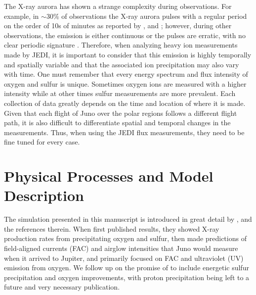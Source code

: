 \documentclass[draft]{agujournal2018}
\begin{document}
The X-ray aurora has shown a strange complexity during observations.
For example, in $\sim$30$\%$ of observations the X-ray aurora pulses with a regular period on the order of 10s of minutes as reported by \citet{dunn2016,dunn2017,gladstone2002}, and \citet{jackman2018}; however, during other observations, the emission is either continuous or the pulses are erratic, with no clear periodic signature \citep{elsner2005,branduardi2007}.
Therefore, when analyzing heavy ion measurements made by JEDI, it is important to consider that this emission is highly temporally and spatially variable and that the associated ion precipitation may also vary with time.
One must remember that every energy spectrum and flux intensity of oxygen and sulfur is unique.
Sometimes oxygen ions are measured with a higher intensity while at other times sulfur measurements are more prevalent.
Each collection of data greatly depends on the time and location of where it is made.
Given that each flight of Juno over the polar regions follows a different flight path, it is also difficult to differentiate spatial and temporal changes in the measurements.
Thus, when using the JEDI flux measurements, they need to be fine tuned for every case.

\section{Physical Processes and Model Description}

The simulation presented in this manuscript is introduced in great detail by \citet{ozak2010,ozak2013,houston2018}, and the references therein.
When \citet{ozak2010} first published results, they showed X-ray production rates from precipitating oxygen and sulfur, then \citet{ozak2013} made predictions of field-aligned currents (FAC) and airglow intensities that Juno would measure when it arrived to Jupiter, and \citet{houston2018} primarily focused on FAC and ultraviolet (UV) emission from oxygen.
We follow up on the promise of \citet{houston2018} to include energetic sulfur precipitation and oxygen improvements, with proton precipitation being left to a future and very necessary publication.
\end{document}
